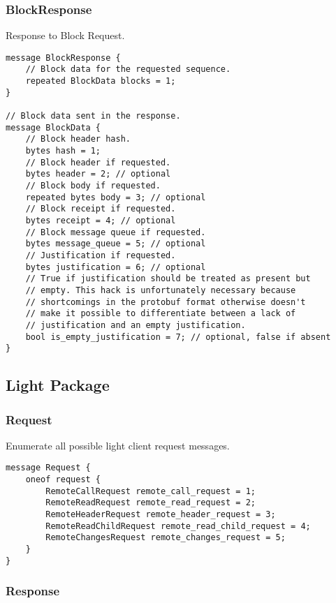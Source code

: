 \documentclass{book}
\begin{document}
\subsubsection{BlockResponse}

Response to Block Request.

\begin{lstlisting}[frame=single]
message BlockResponse {
    // Block data for the requested sequence.
    repeated BlockData blocks = 1;
} 

// Block data sent in the response.
message BlockData {
    // Block header hash.
    bytes hash = 1;
    // Block header if requested.
    bytes header = 2; // optional
    // Block body if requested.
    repeated bytes body = 3; // optional
    // Block receipt if requested.
    bytes receipt = 4; // optional
    // Block message queue if requested.
    bytes message_queue = 5; // optional
    // Justification if requested.
    bytes justification = 6; // optional
    // True if justification should be treated as present but
    // empty. This hack is unfortunately necessary because 
    // shortcomings in the protobuf format otherwise doesn't
    // make it possible to differentiate between a lack of 
    // justification and an empty justification.
    bool is_empty_justification = 7; // optional, false if absent
}
\end{lstlisting}

\subsection{Light Package}

\subsubsection{Request}

Enumerate all possible light client request messages.

\begin{lstlisting}[frame=single]
message Request {
    oneof request {
        RemoteCallRequest remote_call_request = 1;
        RemoteReadRequest remote_read_request = 2;
        RemoteHeaderRequest remote_header_request = 3;
        RemoteReadChildRequest remote_read_child_request = 4;
        RemoteChangesRequest remote_changes_request = 5;
    }
}
\end{lstlisting}

\subsubsection{Response}
\end{document}
